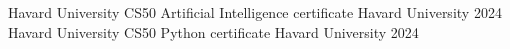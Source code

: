 



\begin{cvhonors}

    
  
      \cvhonor
        {Havard University CS50 Artificial Intelligence certificate} %
        {Havard University} %
        {} %
        {2024} %
      \cvhonor
        {Havard University CS50 Python certificate} %
        {Havard University} %
        {} %
        {2024} %
    
\end{cvhonors}